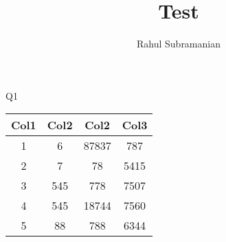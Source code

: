 \documentclass[11pt, oneside]{article}   	%
\title{Test}
\author{Rahul Subramanian}
\begin{document}
\maketitle
\newpage

Q1 

\begin{center}
 \begin{tabular}{||c c c c||} 
 \hline
 Col1 & Col2 & Col2 & Col3 \\ [0.5ex] 
 \hline\hline
 1 & 6 & 87837 & 787 \\ 
 \hline
 2 & 7 & 78 & 5415 \\
 \hline
 3 & 545 & 778 & 7507 \\
 \hline
 4 & 545 & 18744 & 7560 \\
 \hline
 5 & 88 & 788 & 6344 \\ [1ex] 
 \hline
\end{tabular}
\end{center}
\end{document}
